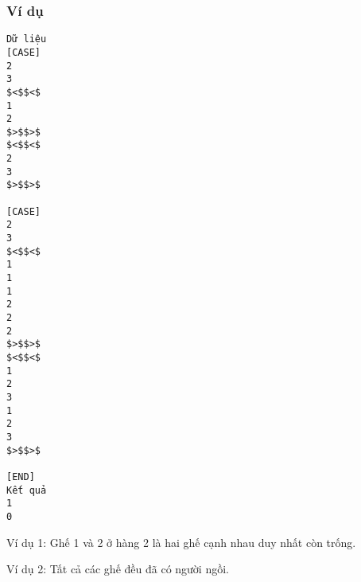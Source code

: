 \subsubsection{   Ví dụ  }
\begin{verbatim}
Dữ liệu
[CASE]
2
3
$<$$<$
1
2
$>$$>$
$<$$<$
2
3
$>$$>$

[CASE]
2
3
$<$$<$
1
1
1
2
2
2
$>$$>$
$<$$<$
1
2
3
1
2
3
$>$$>$

[END]
Kết quả
1
0
\end{verbatim}

   Ví dụ 1: Ghế 1 và 2 ở hàng 2 là hai ghế cạnh nhau duy nhất còn trống.  

   Ví dụ 2: Tất cả các ghế đều đã có người ngồi.  
